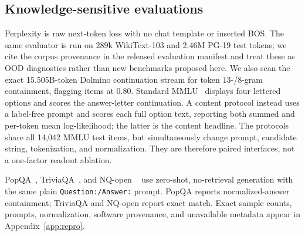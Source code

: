 \subsection{Knowledge-sensitive evaluations}
Perplexity is raw next-token loss with no chat template or inserted BOS.
The same evaluator is run on 289k WikiText-103 and 2.46M PG-19 test tokens; we
cite the corpus provenance in the released evaluation manifest and treat these
as OOD diagnostics rather than new benchmarks proposed here.
We also scan the exact 15.505B-token Dolmino continuation stream for token
$13$-/$8$-gram containment, flagging items at 0.80.
Standard MMLU~\citep{hendrycks2021mmlu} displays four lettered options and
scores the answer-letter continuation. A content protocol instead uses a
label-free prompt and scores each full option text, reporting both summed and
per-token mean log-likelihood; the latter is the content headline. The
protocols share all 14,042 MMLU test items, but simultaneously change prompt,
candidate string, tokenization, and normalization. They are therefore paired
interfaces, not a one-factor readout ablation.

PopQA~\citep{mallen2023popqa}, TriviaQA~\citep{joshi2017triviaqa}, and NQ-open
~\citep{kwiatkowski2019natural} use zero-shot, no-retrieval generation with the
same plain \texttt{Question:/Answer:} prompt. PopQA reports normalized-answer
containment; TriviaQA and NQ-open report exact match. Exact sample counts,
prompts, normalization, software provenance, and unavailable metadata appear
in Appendix~\ref{app:repro}.
